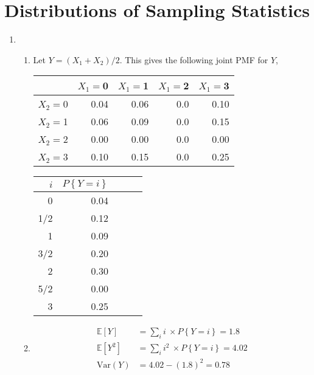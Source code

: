 \chapter{Distributions of Sampling Statistics}

\begin{enumerate}
	
	\item 
		\begin{enumerate}
			\item Let $ Y = (X_1 + X_2) / 2 $. This gives the following joint PMF for $ Y $,\\
			\begin{table}[H]
				\centering
				\begin{tabular}{@{}rrrrr@{}}
					\toprule
					&     $ X_1 =  $0 &     $ X_1 =  $1 &    $ X_1 =  $2 &     $ X_1 =  $3 \\
					\midrule
					$ X_2 =  $0 &  0.04 &  0.06 &  0.0 &  0.10 \\
					$ X_2 =  $1 &  0.06 &  0.09 &  0.0 &  0.15 \\
					$ X_2 =  $2 &  0.00 &  0.00 &  0.0 &  0.00 \\
					$ X_2 =  $3 &  0.10 &  0.15 &  0.0 &  0.25 \\
					\bottomrule
				\end{tabular}
			\end{table}
			
			\begin{table}[H]
				\centering
				\begin{tabular}{@{}rrrrr@{}}
					\toprule
					$ i $ &     $P\left\{Y = i\right\}$ \\
					\midrule
					0 &  0.04  \\
					1/2 &  0.12  \\
					1 &  0.09  \\
					3/2 &  0.20  \\
					2 & 0.30 \\
					5/2 & 0.00 \\
					3 & 0.25 \\
					\bottomrule
				\end{tabular}
			\end{table}
			
			\item \begin{align}
				\mathbb{E}[Y] &= \sum\limits_{i} i\ \times P\left\{Y = i\right\} = 1.8 \\
				\mathbb{E}[Y^2] &= \sum\limits_{i} i^2\ \times P\left\{Y = i\right\} = 4.02 \nonumber \\
				\mathrm{Var}(Y) &= 4.02 - (1.8)^2 = 0.78
			\end{align}\\
			

\end{enumerate}
\end{enumerate}
